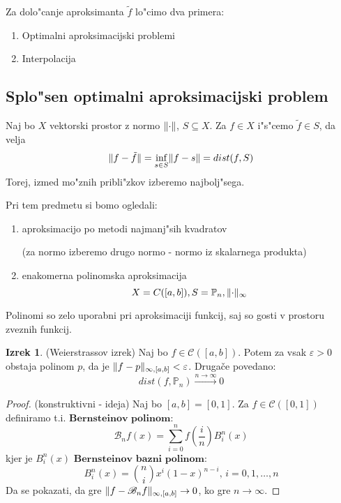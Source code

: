\documentclass[a4paper,12pt]{article}
\DeclarePairedDelimiter\norm{\lVert}{\rVert}
\theoremstyle{definition}
\newtheorem{theorem}[counter]{Izrek}
\theoremstyle{remark}
\newcommand{\Pp}{\mathbb{P}}
\begin{document}
Za dolo"canje aproksimanta $\tilde{f}$ lo"cimo dva primera:
\begin{enumerate}
    \item Optimalni aproksimacijski problemi
    \item Interpolacija
\end{enumerate}


\subsection{Splo"sen optimalni aproksimacijski problem}
Naj bo $X$ vektorski prostor z normo $\norm{\cdot}$, $S \subseteq X$. Za $f \in X$ i"s"cemo $\tilde{f} \in S$, da velja
\begin{equation*}
    \norm{f - \tilde{f}} = \inf_{s \in S} \norm{f - s} = dist(f, S)
\end{equation*}
Torej, izmed mo"znih pribli"zkov izberemo najbolj"sega.


Pri tem predmetu si bomo ogledali:
\begin{enumerate}
    \item aproksimacijo po metodi najmanj"sih kvadratov
    
    (za normo izberemo drugo normo - normo iz skalarnega produkta)
    \item enakomerna polinomska aproksimacija
    \[X = C([a, b]), S = \Pp_n, \norm{\cdot}_{\infty}\]
\end{enumerate}

Polinomi so zelo uporabni pri aproksimaciji funkcij, saj so gosti v prostoru zveznih funkcij.

\begin{theorem} (Weierstrassov izrek)
    Naj bo $f \in \mathscr{C} ([a, b])$. Potem za vsak $\varepsilon > 0$ obstaja polinom $p$, da je $\norm{f - p}_{\infty, [a, b]} < \varepsilon$. Drugače povedano:
    \begin{equation*}
        dist(f, \Pp_n) \stackrel{n \to \infty}{\longrightarrow} 0
    \end{equation*}
\end{theorem}

\begin{proof}(konstruktivni - ideja)
    Naj bo $[a, b] = [0, 1]$. Za $f \in \mathscr{C} ([0, 1])$ definiramo t.i. $\textbf{Bernsteinov polinom}$:
    \begin{equation*}
        \mathscr{B}_n f (x) = \sum_{i = 0}^{n} f (\frac{i}{n}) B_i^n(x)
    \end{equation*}
    kjer je $B_i^n(x)$ $\textbf{Bernsteinov bazni polinom}$:
    \begin{equation*}
        B_i^n (x) = {n \choose i} x^i (1-x)^{n-i} \text{, } i = 0, 1, \dots, n  
    \end{equation*}
    Da se pokazati, da gre $\norm{f - \mathscr{B}_n f}_{\infty, [a, b]} \to 0$, ko gre $n \to \infty$.
\end{proof}
\end{document}
